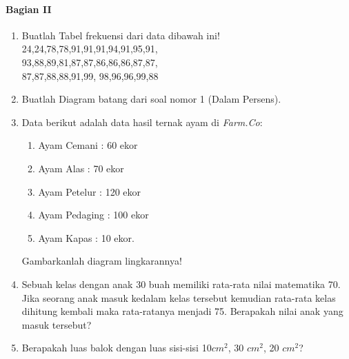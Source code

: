 \documentclass[12pt,a4paper,twocolumn]{article}
\begin{document}
	\paragraph{Bagian II}
	\begin{enumerate}
		\item Buatlah Tabel frekuensi dari data dibawah ini!\\
		24,24,78,78,91,91,91,94,91,95,91,\\93,88,89,81,87,87,86,86,86,87,87,\\87,87,88,88,91,99, 98,96,96,99,88\\
		\item Buatlah Diagram batang dari soal nomor 1 (Dalam Persens).
		\item Data berikut adalah data hasil ternak ayam di \textit{Farm.Co}:
		\begin{enumerate}
			\item Ayam Cemani : 60 ekor
			\item Ayam Alas	  : 70 ekor
			\item Ayam Petelur : 120 ekor
			\item Ayam Pedaging : 100 ekor
			\item Ayam Kapas	: 10 ekor.
		\end{enumerate}
		Gambarkanlah diagram lingkarannya!
			\item Sebuah kelas dengan anak 30 buah memiliki rata-rata nilai matematika 70. Jika seorang anak masuk kedalam kelas tersebut kemudian rata-rata kelas dihitung kembali maka rata-ratanya menjadi 75. Berapakah nilai anak yang masuk tersebut?
			\item Berapakah luas balok dengan luas sisi-sisi 10$cm^2$, 30 $cm^2$, 20 $cm^2$?
		\end{enumerate}
		
			
\end{document}
